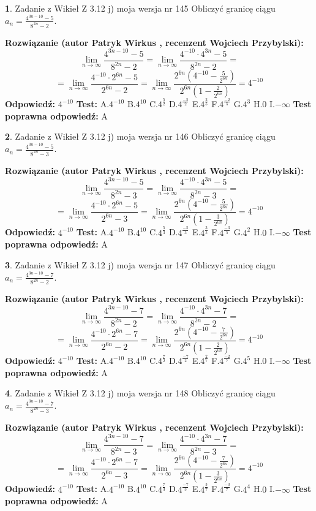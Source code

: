 \documentclass[12pt, a4paper]{article}
\theoremstyle{definition} %
\newtheorem{zad}{}
\newcommand{\zadStart}[1]{\begin{zad}#1\newline}
\newcommand{\zadStop}{\end{zad}}
\newcommand{\rozwStart}[2]{\noindent \textbf{Rozwiązanie (autor #1 , recenzent #2): }\newline}
\newcommand{\rozwStop}{\newline}
\newcommand{\odpStart}{\noindent \textbf{Odpowiedź:}\newline}
\newcommand{\odpStop}{\newline}
\newcommand{\testStart}{\noindent \textbf{Test:}\newline}
\newcommand{\testStop}{\newline}
\newcommand{\kluczStart}{\noindent \textbf{Test poprawna odpowiedź:}\newline}
\newcommand{\kluczStop}{\newline}
\begin{document}
\zadStart{Zadanie z Wikieł Z 3.12 j) moja wersja nr 145}
Obliczyć granicę ciągu $a_{n}=\frac{4^{3n-10}-5}{8^{2n}-2}$.
\zadStop
\rozwStart{Patryk Wirkus}{Wojciech Przybylski}
$$\lim\limits_{n\to\infty}\frac{4^{3n-10}-5}{8^{2n}-2}= \lim\limits_{n\to\infty}\frac{4^{-10} \cdot 4^{3n}-5}{8^{2n}-2}=$$
$$= \lim\limits_{n\to\infty}\frac{4^{-10} \cdot 2^{6n}-5}{2^{6n}-2}= \lim\limits_{n\to\infty}\frac{2^{6n}(4^{-10} - \frac{5}{2^{6n}})}{2^{6n}(1-\frac{2}{2^{6n}})}= 4^{-10}$$
\rozwStop
\odpStart
$4^{-10}$
\odpStop
\testStart
A.$4^{-10}$
B.$4^{10}$
C.$4^{\frac{5}{2}}$
D.$4^{\frac{-5}{2}}$
E.$4^{\frac{2}{5}}$
F.$4^{\frac{-2}{5}}$
G.$4^{3}$
H.$0$
I.$-\infty$
\testStop
\kluczStart
A
\kluczStop



\zadStart{Zadanie z Wikieł Z 3.12 j) moja wersja nr 146}
Obliczyć granicę ciągu $a_{n}=\frac{4^{3n-10}-5}{8^{2n}-3}$.
\zadStop
\rozwStart{Patryk Wirkus}{Wojciech Przybylski}
$$\lim\limits_{n\to\infty}\frac{4^{3n-10}-5}{8^{2n}-3}= \lim\limits_{n\to\infty}\frac{4^{-10} \cdot 4^{3n}-5}{8^{2n}-3}=$$
$$= \lim\limits_{n\to\infty}\frac{4^{-10} \cdot 2^{6n}-5}{2^{6n}-3}= \lim\limits_{n\to\infty}\frac{2^{6n}(4^{-10} - \frac{5}{2^{6n}})}{2^{6n}(1-\frac{3}{2^{6n}})}= 4^{-10}$$
\rozwStop
\odpStart
$4^{-10}$
\odpStop
\testStart
A.$4^{-10}$
B.$4^{10}$
C.$4^{\frac{5}{3}}$
D.$4^{\frac{-5}{3}}$
E.$4^{\frac{3}{5}}$
F.$4^{\frac{-3}{5}}$
G.$4^{2}$
H.$0$
I.$-\infty$
\testStop
\kluczStart
A
\kluczStop



\zadStart{Zadanie z Wikieł Z 3.12 j) moja wersja nr 147}
Obliczyć granicę ciągu $a_{n}=\frac{4^{3n-10}-7}{8^{2n}-2}$.
\zadStop
\rozwStart{Patryk Wirkus}{Wojciech Przybylski}
$$\lim\limits_{n\to\infty}\frac{4^{3n-10}-7}{8^{2n}-2}= \lim\limits_{n\to\infty}\frac{4^{-10} \cdot 4^{3n}-7}{8^{2n}-2}=$$
$$= \lim\limits_{n\to\infty}\frac{4^{-10} \cdot 2^{6n}-7}{2^{6n}-2}= \lim\limits_{n\to\infty}\frac{2^{6n}(4^{-10} - \frac{7}{2^{6n}})}{2^{6n}(1-\frac{2}{2^{6n}})}= 4^{-10}$$
\rozwStop
\odpStart
$4^{-10}$
\odpStop
\testStart
A.$4^{-10}$
B.$4^{10}$
C.$4^{\frac{7}{2}}$
D.$4^{\frac{-7}{2}}$
E.$4^{\frac{2}{7}}$
F.$4^{\frac{-2}{7}}$
G.$4^{5}$
H.$0$
I.$-\infty$
\testStop
\kluczStart
A
\kluczStop



\zadStart{Zadanie z Wikieł Z 3.12 j) moja wersja nr 148}
Obliczyć granicę ciągu $a_{n}=\frac{4^{3n-10}-7}{8^{2n}-3}$.
\zadStop
\rozwStart{Patryk Wirkus}{Wojciech Przybylski}
$$\lim\limits_{n\to\infty}\frac{4^{3n-10}-7}{8^{2n}-3}= \lim\limits_{n\to\infty}\frac{4^{-10} \cdot 4^{3n}-7}{8^{2n}-3}=$$
$$= \lim\limits_{n\to\infty}\frac{4^{-10} \cdot 2^{6n}-7}{2^{6n}-3}= \lim\limits_{n\to\infty}\frac{2^{6n}(4^{-10} - \frac{7}{2^{6n}})}{2^{6n}(1-\frac{3}{2^{6n}})}= 4^{-10}$$
\rozwStop
\odpStart
$4^{-10}$
\odpStop
\testStart
A.$4^{-10}$
B.$4^{10}$
C.$4^{\frac{7}{3}}$
D.$4^{\frac{-7}{3}}$
E.$4^{\frac{3}{7}}$
F.$4^{\frac{-3}{7}}$
G.$4^{4}$
H.$0$
I.$-\infty$
\testStop
\kluczStart
A
\kluczStop
\end{document}
